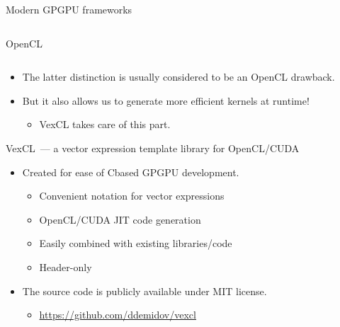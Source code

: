 \documentclass[@BEAMER_OPTIONS@]{beamer}
\newcommand{\CXX}{{\rm C}\plusplus}
\begin{document}
\begin{frame}{Modern GPGPU frameworks}
\begin{columns}
\begin{column}{0.45\textwidth}
\begin{block}{OpenCL}
            \end{block}
        \end{column}
    \end{columns}
    \vspace{\baselineskip}
    \pause
    \begin{itemize}
        \item The latter distinction is usually considered to be an OpenCL
            drawback.
        \item But it also allows us to generate more efficient kernels at
            runtime!
            \begin{itemize}
                \item VexCL takes care of this part.
            \end{itemize}
    \end{itemize}
\end{frame}


\begin{frame}{VexCL~--- a vector expression template library for OpenCL/CUDA}
    \begin{itemize}
        \item Created for ease of \CXX based GPGPU development.
            \begin{itemize}
                \item Convenient notation for vector expressions
                \item OpenCL/CUDA JIT code generation
                \item Easily combined with existing libraries/code
                \item Header-only
            \end{itemize}
            \vspace{\baselineskip}
        \item The source code is publicly available under MIT license.
            \begin{itemize}
                \item \href{https://github.com/ddemidov/vexcl}{https://github.com/ddemidov/vexcl}
            \end{itemize}
            \vspace{\baselineskip}
    \end{itemize}

\end{frame}
\end{document}
